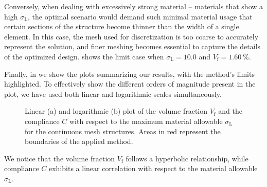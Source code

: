 Conversely, when dealing with excessively strong material -- \ie materials that show a high $\sigma_\text{L}$, the optimal scenario would demand such minimal material usage that certain sections of the structure become thinner than the width of a single element. In this case, the mesh used for discretization is too coarse to accurately represent the solution, and finer meshing becomes essential to capture the details of the optimized design.  shows
the limit case when $\sigma_\text{L}=10.0$ and $V_\text{f}=\qty{1.60}{\percent}$.

Finally, in  we show the plots summarizing our results, with the method's limits highlighted. To effectively show the different orders of magnitude present in the plot, we have used both linear and logarithmic scales simultaneously.
\begin{figure}
    \hspace*{\fill}
    \hfill
    \hspace*{\fill}
    \caption{Linear (a) and logarithmic (b) plot of the volume fraction $V_\text{f}$ and the compliance $C$ with respect to the maximum material allowable $\sigma_\text{L}$ for the continuous mesh structures. Areas in red represent the boundaries of the applied method.}
    \label{fig:03_to_plot}
\end{figure}
We notice that the volume fraction $V_\text{f}$ follows a hyperbolic relationship, while compliance $C$ exhibits a linear correlation with respect to the material allowable $\sigma_\text{L}$.


